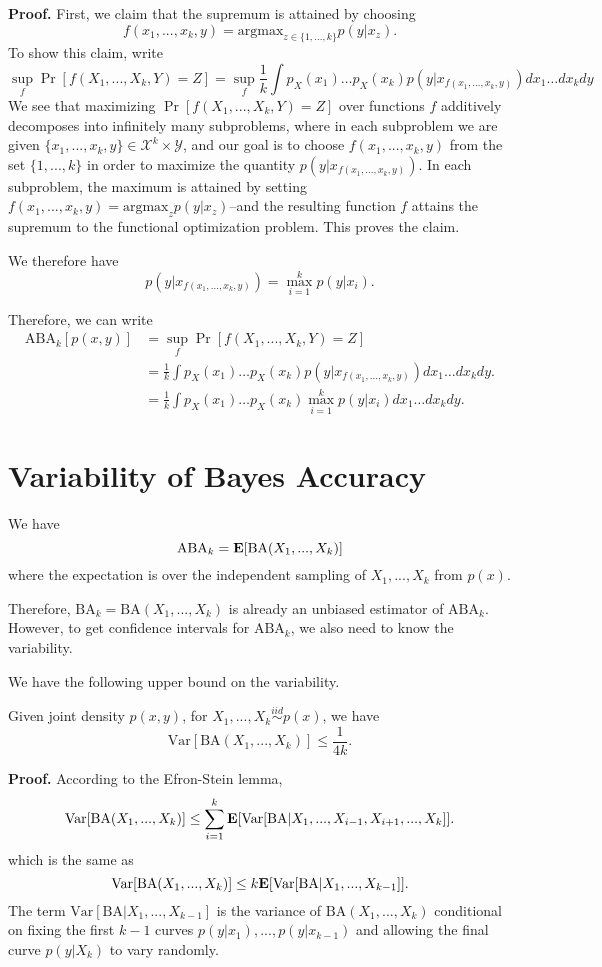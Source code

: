 \documentclass[12pt]{article}
\begin{document}
\noindent\textbf{Proof.}
First, we claim that the supremum is attained by choosing
\[
f(x_1,...,x_k, y) = \text{argmax}_{z \in \{1,...,k\}} p(y|x_z).
\]
To show this claim, write
\[
\sup_f \Pr[f(X_1,...,X_k, Y) = Z] = \sup_f \frac{1}{k}\int p_X(x_1)\hdots p_X(x_k) p(y|x_{f(x_1,...,x_k, y)}) dx_1\hdots dx_k dy
\]
We see that maximizing $\Pr[f(X_1,...,X_k, Y) = Z]$ over functions $f$
additively decomposes into infinitely many subproblems, where in each
subproblem we are given $\{x_1,...,x_k,
y\} \in \mathcal{X}^k \times \mathcal{Y}$, and our goal is to choose
$f(x_1,...,x_k, y)$ from the set $\{1,...,k\}$ in order to maximize
the quantity $p(y|x_{f(x_1,...,x_k, y)})$.  In each subproblem,
the maximum is attained by setting $f(x_1,...,x_k,y) = \text{argmax}_z
p(y|x_z)$--and the resulting function $f$ attains the supremum to the
functional optimization problem.  This proves the claim.

We therefore have
\[
p(y|x_{f(x_1,...,x_k, y)}) = \max_{i=1}^k p(y|x_i).
\]

Therefore, we can write
\begin{align*}
\text{ABA}_k[p(x, y)] &= \sup_f \Pr[f(X_1,...,X_k, Y) = Z]
\\&=  \frac{1}{k} \int p_X(x_1)\hdots p_X(x_k) p(y|x_{f(x_1,...,x_k, y)})  dx_1\hdots dx_k dy.
\\&=  \frac{1}{k} \int p_X(x_1)\hdots p_X(x_k) \max_{i=1}^k p(y|x_i)  dx_1\hdots dx_k dy.
\end{align*}

\section{Variability of Bayes Accuracy}
We have
\[
\text{ABA}_k = \textbf{E}[\text{BA}(X_1,...,X_k)]
\]
where the expectation is over the independent sampling of $X_1,...,X_k$ from $p(x)$.

Therefore, $\text{BA}_k = \text{BA}(X_1,...,X_k)$ is already an
unbiased estimator of $\text{ABA}_k$.  However, to get confidence
intervals for $\text{ABA}_k$, we also need to know the variability.

We have the following upper bound on the variability.

\begin{theorem}
Given joint density $p(x, y)$, for $X_1,...,X_k \stackrel{iid}{\sim} p(x)$, we have
\[
\text{Var}[\text{BA}(X_1,...,X_k)] \leq \frac{1}{4k}.
\]
\end{theorem}

\noindent\textbf{Proof.}
According to the Efron-Stein lemma,
\[
\text{Var}[\text{BA}(X_1,...,X_k)] \leq \sum_{i=1}^k \textbf{E}[\text{Var}[\text{BA}|X_1,...,X_{i-1}, X_{i+1}, ..., X_k]].
\]
which is the same as
\[
\text{Var}[\text{BA}(X_1,...,X_k)] \leq k \textbf{E}[\text{Var}[\text{BA}|X_1,...,X_{k-1}]].
\]
The term $\text{Var}[\text{BA}|X_1,...,X_{k-1}]$ is the variance of $\text{BA}(X_1,...,X_k)$
conditional on fixing the first $k-1$ curves $p(y|x_1),...,p(y|x_{k-1})$ and allowing the final curve $p(y|X_k)$ to vary randomly.
\end{document}

